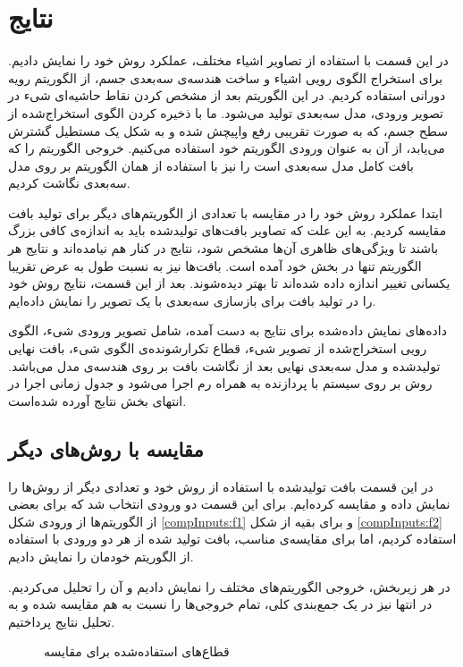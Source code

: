 
\chapter{نتایج}
\label{section_results}
در این قسمت با استفاده از تصاویر اشیاء مختلف، عملکرد روش خود را نمایش دادیم. برای استخراج الگوی رویی اشیاء و ساخت هندسه‌ی سه‌بعدی جسم، از الگوریتم رویه دورانی\cite{SMH.Hosseini} استفاده کردیم. در این الگوریتم بعد از مشخص کردن نقاط حاشیه‌ای شیء در تصویر ورودی، مدل سه‌بعدی تولید می‌شود. ما با ذخیره کردن الگو‌ی استخراج‌شده از سطح جسم، که به صورت تقریبی رفع واپیچش شده و به شکل یک مستطیل گشترش می‌یابد، از آن به عنوان ورودی الگوریتم خود استفاده می‌کنیم. خروجی الگوریتم را که بافت کامل مدل سه‌بعدی است را نیز با استفاده از همان الگوریتم بر روی مدل سه‌بعدی نگاشت کردیم.

ابتدا عملکرد روش خود را در مقایسه با تعدادی از الگوریتم‌های دیگر برای تولید بافت مقایسه کردیم. به این علت که تصاویر بافت‌های تولید‌شده باید به اندازه‌ی کافی بزرگ باشند تا ویژگی‌های ظاهری آن‌ها مشخص شود، نتایج در کنار هم نیامده‌اند و نتایج هر الگوریتم تنها در بخش خود آمده است. بافت‌ها نیز به نسبت طول به عرض تقریبا یکسانی تغییر اندازه داده شده‌اند تا بهتر دیده‌شوند. بعد از این قسمت، نتایج روش خود را در تولید بافت برای بازسازی سه‌بعدی با یک تصویر را نمایش داده‌ایم.

داده‌های نمایش داده‌شده برای نتایج به دست آمده، شامل تصویر ورودی شیء، الگوی رویی استخراج‌شده از تصویر شیء، قطاع تکرارشونده‌ی الگوی شیء، بافت نهایی تولید‌شده و مدل سه‌بعدی نهایی بعد از نگاشت بافت بر روی هندسه‌ی مدل می‌باشد. روش بر روی سیستم با پردازنده  به همراه 
 رم اجرا می‌شود و جدول زمانی اجرا در انتها‌ی بخش نتایج آورده شده‌است.
\section{مقایسه با روش‌های دیگر}

در این قسمت بافت تولید‌شده با استفاده از روش خود و تعدادی دیگر از روش‌ها را نمایش داده و مقایسه کرده‌ایم. برای این قسمت دو ورودی انتخاب شد که برای بعضی از الگوریتم‌ها از ورودی شکل \ref{compInputs:f1} و برای بقیه از شکل \ref{compInputs:f2} استفاده کردیم، اما برای مقایسه‌ی مناسب، بافت تولید شده از هر دو ورودی با استفاده از الگوریتم خودمان را نمایش دادیم.

در هر زیربخش، خروجی الگوریتم‌های مختلف را نمایش دادیم و آن را تحلیل می‌کردیم. در انتها نیز در یک جمع‌بندی کلی، تمام خروجی‌ها را نسبت به هم مقایسه شده و به تحلیل نتایج پرداختیم.

\begin{figure}[h]
	\centering
	\qquad
	\caption{قطاع‌های استفاده‌شده برای مقایسه}
	\label{compInputs}
\end{figure}


